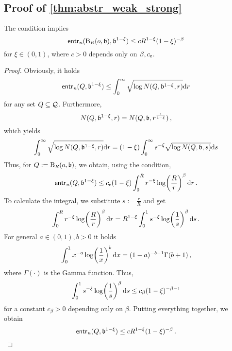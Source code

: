 \subsection{Proof of \autoref{thm:abstr_weak_strong}}
%
\begin{lemma}\label{lmm:entropyuse}
	The condition  implies
	\begin{equation*}
		\operatorname{\mathsf{entr}_\mathit{n}}(\operatorname{\mathrm{B}}_{R}(o, \mathfrak{b}), \mathfrak{b}^{1-\xi})
		\leq 
		c R^{1-\xi} (1-\xi)^{-\beta}
	\end{equation*}
	for $\xi \in (0,1)$, where $c > 0$ depends only on $\beta, c_{\mathsf{e}}$.
\end{lemma}
\begin{proof}
	Obviously, it holds
	\begin{equation*}
		\operatorname{\mathsf{entr}_\mathit{n}}(Q, \mathfrak{b}^{1-\xi}) \leq \int_0^\infty \sqrt{\log N(Q, \mathfrak{b}^{1-\xi}, r)} \mathrm{d} r
	\end{equation*}
	for any set $Q \subseteq \mathcal{Q}$. Furthermore,
	\begin{equation*}
		N(Q, \mathfrak{b}^{1-\xi}, r) = N(Q, \mathfrak{b}, r^{\frac1{1-\xi}})
		\, ,
	\end{equation*}
	which yields
	\begin{equation*}
		\int_0^\infty \sqrt{\log N(Q, \mathfrak{b}^{1-\xi}, r)} \mathrm{d} r
		=
		(1-\xi) \int_0^\infty s^{-\xi} \sqrt{\log N(Q, \mathfrak{b}, s)} \mathrm{d} s
	\end{equation*}
	Thus, for $Q := \operatorname{\mathrm{B}}_{R}(o, \mathfrak{b})$, we obtain, using the  condition,
	\begin{equation*}
		\operatorname{\mathsf{entr}_\mathit{n}}(Q, \mathfrak{b}^{1-\xi})
		\leq 
		c_{\mathsf{e}} (1-\xi) \int_0^R r^{-\xi} \log\!\left( \frac{R}{r} \right)^\beta \mathrm{d} r
		\, .
	\end{equation*}
	To calculate the integral, we substitute $s := \frac rR$ and get
	\begin{equation*}
		\int_0^R r^{-\xi} \log\!\left( \frac{R}{r} \right)^\beta \mathrm{d} r
		=
		R^{1-\xi} \int_0^1 s^{-\xi} \log\!\left( \frac{1}{s} \right)^\beta \mathrm{d} s
		\, .
	\end{equation*}
	For general $a\in(0,1),b>0$ it holds
	\begin{equation*}
		\int_0^1 x^{-a} \log\!\left( \frac1x \right)^b \mathrm{d} x = (1-a)^{-b-1} \Gamma(b+1)
		\, ,
	\end{equation*}
	where $\Gamma(\cdot)$ is the Gamma function.
	Thus,
	\begin{equation*}
		\int_0^1 s^{-\xi} \log\!\left( \frac{1}{s} \right)^\beta \mathrm{d} s \leq c_\beta (1-\xi)^{-\beta-1}
	\end{equation*}
	for a constant $c_\beta > 0$ depending only on $\beta$.
	Putting everything together, we obtain
	\begin{equation*}
		\operatorname{\mathsf{entr}_\mathit{n}}(Q, \mathfrak{b}^{1-\xi})
		\leq 
		c R^{1-\xi} (1-\xi)^{-\beta}
		\, .
	\end{equation*}
\end{proof}
